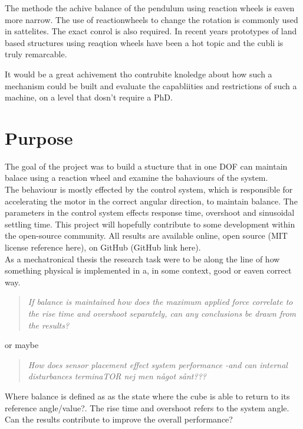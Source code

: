 \documentclass[a4paper,11pt]{kth-mag}
\newenvironment{italicquotes}
{\begin{quote}\itshape}
{\end{quote}}
\begin{document}
The methode the achive balance of the pendulum using reaction wheels is eaven more narrow. 
The use of reactionwheels to change the rotation is commonly used in sattelites. The exact conrol is also required.
In recent years prototypes of land based structures using reaqtion wheels have been a hot topic and the cubli is
truly remarcable.

It would be a great achivement tho contrubite knoledge about how such a mechanism could be built and evaluate
the capabliities and restrictions of such a machine, on a level that dosn't require a PhD.


\section{Purpose}
The goal of the project was to build a stucture that in one DOF can maintain balace using a reaction wheel and examine the bahaviours of the system.\\
The behaviour is mostly effected by the control system, which is responsible for accelerating the motor in the  correct angular direction, to maintain balance. The parameters in the control system effects response time, overshoot and sinusoidal settling time.
This project will hopefully contribute to some development within the open-source community.
All results are available online, open source (MIT license reference here), on GitHub (GitHub link here).\\ 
As a mechatronical thesis the research task were to be along the line of how something physical is implemented 
in a, in some context, good or eaven correct way. 
\begin{italicquotes}
If balance is maintained how does the maximum applied force correlate to the rise time and overshoot separately, can any conclusions be drawn from the results?
\end{italicquotes}
or maybe
\begin{italicquotes}
How does sensor placement effect system performance -and can internal disturbances terminaTOR nej men något sånt???
\end{italicquotes}
Where balance is defined as as the state where the cube is able to return to its reference angle/value?. The rise time and overshoot refers to the system angle. Can the results contribute to improve the overall performance?
\end{document}
